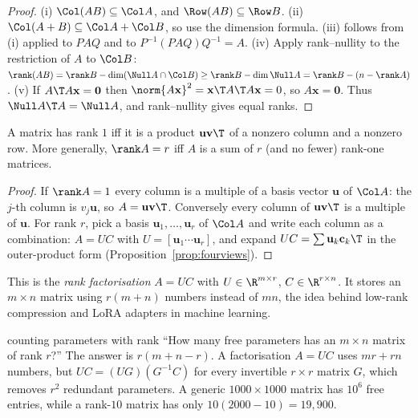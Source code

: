 \begin{proof}
(i) $\Col(AB)\subseteq\Col A$, and $\Row(AB)\subseteq\Row B$. (ii) $\Col(A+B)\subseteq\Col A+\Col B$, so use the dimension formula. (iii) follows from (i) applied to $PAQ$ and to $P^{-1}(PAQ)Q^{-1}=A$. (iv) Apply rank--nullity to the restriction of $A$ to $\Col B$: $\rank(AB)=\rank B-\dim(\Null A\cap\Col B)\ge\rank B-\dim\Null A=\rank B-(n-\rank A)$. (v) If $A\T A\mathbf{x}=\mathbf{0}$ then $\norm{A\mathbf{x}}^2=\mathbf{x}\T A\T A\mathbf{x}=0$, so $A\mathbf{x}=\mathbf{0}$. Thus $\Null A\T A=\Null A$, and rank--nullity gives equal ranks.
\end{proof}

\begin{theorem}\label{thm:rankone}
A matrix has rank $1$ iff it is a product $\mathbf{u}\mathbf{v}\T$ of a nonzero column and a nonzero row. More generally, $\rank A=r$ iff $A$ is a sum of $r$ (and no fewer) rank-one matrices.
\end{theorem}

\begin{proof}
If $\rank A=1$ every column is a multiple of a basis vector $\mathbf{u}$ of $\Col A$: the $j$-th column is $v_j\mathbf{u}$, so $A=\mathbf{u}\mathbf{v}\T$. Conversely every column of $\mathbf{u}\mathbf{v}\T$ is a multiple of $\mathbf{u}$. For rank $r$, pick a basis $\mathbf{u}_1,\dots,\mathbf{u}_r$ of $\Col A$ and write each column as a combination: $A=UC$ with $U=[\mathbf{u}_1\cdots\mathbf{u}_r]$, and expand $UC=\sum\mathbf{u}_k\mathbf{c}_k\T$ in the outer-product form (Proposition~\ref{prop:fourviews}).
\end{proof}

This is the \emph{rank factorisation} $A=UC$ with $U\in\R^{m\times r}$, $C\in\R^{r\times n}$. It stores an $m\times n$ matrix using $r(m+n)$ numbers instead of $mn$, the idea behind low-rank compression and LoRA adapters in machine learning.

\begin{interview}{counting parameters with rank}
``How many free parameters has an $m\times n$ matrix of rank $r$?'' The answer is $r(m+n-r)$. A factorisation $A=UC$ uses $mr+rn$ numbers, but $UC=(UG)(G^{-1}C)$ for every invertible $r\times r$ matrix $G$, which removes $r^2$ redundant parameters. A generic $1000\times1000$ matrix has $10^6$ free entries, while a rank-$10$ matrix has only $10(2000-10)=19{,}900$.
\end{interview}

